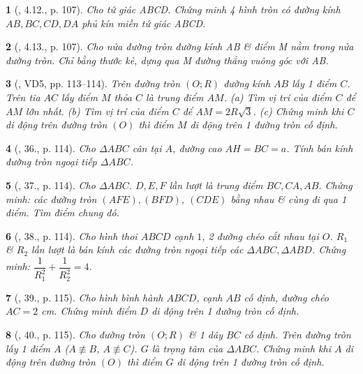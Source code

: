 \documentclass{article}
\newtheorem{baitoan}{}
\begin{document}
\begin{baitoan}[\cite{Binh_boi_duong_Toan_9_tap_1}, 4.12., p. 107]
	Cho tứ giác ABCD. Chứng minh 4 hình tròn có đường kính $AB,BC,CD,DA$ phủ kín miền tứ giác ABCD.
\end{baitoan}

\begin{baitoan}[\cite{Binh_boi_duong_Toan_9_tap_1}, 4.13., p. 107]
	Cho nửa đường tròn đường kính AB \& điểm M nằm trong nửa đường tròn. Chỉ bằng thước kẻ, dựng qua M đường thẳng vuông góc với AB.
\end{baitoan}

\begin{baitoan}[\cite{Tuyen_Toan_9_old}, VD5, pp. 113--114]
	Trên đường tròn $(O;R)$ đường kính $AB$ lấy 1 điểm $C$. Trên tia $AC$ lấy điểm $M$ thỏa $C$ là trung điểm $AM$. (a) Tìm vị trí của điểm $C$ để $AM$ lớn nhất. (b) Tìm vị trí của điểm $C$ để $AM = 2R\sqrt{3}$. (c) Chứng minh khi $C$ di động trên đường tròn $(O)$ thì điểm $M$ di động trên 1 đường tròn cố định.
\end{baitoan}

\begin{baitoan}[\cite{Tuyen_Toan_9_old}, 36., p. 114]
	Cho $\Delta ABC$ cân tại $A$, đường cao $AH = BC = a$. Tính bán kính đường tròn ngoại tiếp $\Delta ABC$.
\end{baitoan}

\begin{baitoan}[\cite{Tuyen_Toan_9_old}, 37., p. 114]
	Cho $\Delta ABC$. $D,E,F$ lần lượt là trung điểm $BC,CA,AB$. Chứng minh: các đường tròn $(AFE),(BFD)$, $(CDE)$ bằng nhau \& cùng đi qua 1 điểm. Tìm điểm chung đó.
\end{baitoan}

\begin{baitoan}[\cite{Tuyen_Toan_9_old}, 38., p. 114]
	Cho hình thoi $ABCD$ cạnh $1$, 2 đường chéo cắt nhau tại $O$. $R_1$ \& $R_2$ lần lượt là bán kính các đường tròn ngoại tiếp các $\Delta ABC,\Delta ABD$. Chứng minh: $\dfrac{1}{R_1^2} + \dfrac{1}{R_2^2} = 4$.
\end{baitoan}

\begin{baitoan}[\cite{Tuyen_Toan_9_old}, 39., p. 115]
	Cho hình bình hành $ABCD$, cạnh $AB$ cố định, đường chéo $AC = 2$ \emph{cm}. Chứng minh điểm $D$ di động trên 1 đường tròn cố định.
\end{baitoan}

\begin{baitoan}[\cite{Tuyen_Toan_9_old}, 40., p. 115]
	Cho đường tròn $(O;R)$ \& 1 dây $BC$ cố định. Trên đường tròn lấy 1 điểm $A$ ($A\not\equiv B$, $A\not\equiv C$). $G$ là trọng tâm của $\Delta ABC$. Chứng minh khi $A$ di động trên đường tròn $(O)$ thì điểm $G$ di động trên 1 đường tròn cố định.
\end{baitoan}
\end{document}
